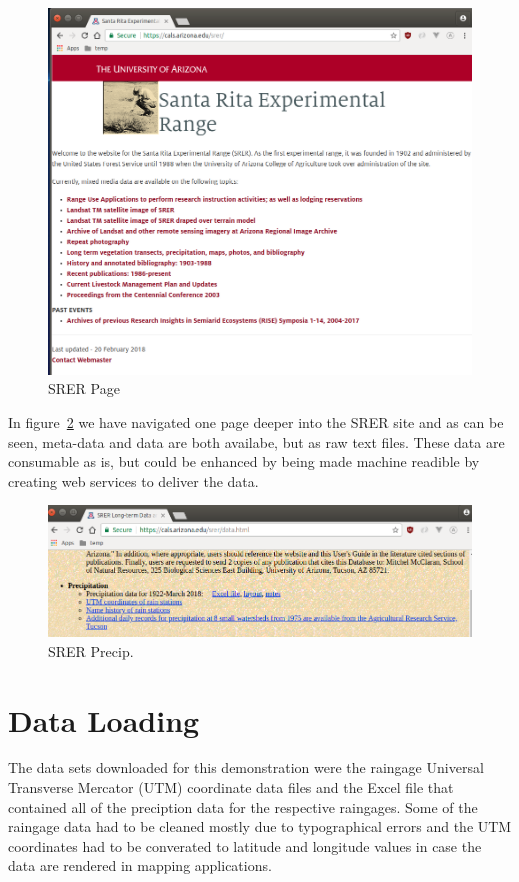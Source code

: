 \begin{figure}[htb]
  \centering\includegraphics[width=\columnwidth]{./images/srerlandingpage.png}
  \caption{SRER Page\cite{hid505SrerWebSite2018}}\label{f:srer_landing_page}
\end{figure}


In figure~\ref{f:srerprecipdata} we have navigated one page deeper into 
the SRER site and as can be seen, meta-data and data are both availabe, but as 
raw text files.  These data are consumable as is, but could be enhanced by 
being made machine readible by creating web services to deliver the data.

\begin{figure}[htb]
  \centering\includegraphics[width=\columnwidth]{./images/srerprecipdata.png}
  \caption{SRER Precip.\cite{hid505SrerWebSite2018}}\label{f:srerprecipdata}
\end{figure}

\section{Data Loading}
The data sets downloaded for this demonstration were the raingage Universal 
Transverse Mercator (UTM) coordinate data files and the Excel file that 
contained all of the preciption data for the respective raingages.  Some of 
the raingage data had to be cleaned mostly due to typographical errors and the 
UTM coordinates had to be converated to latitude and longitude values in case 
the data are rendered in mapping applications.

